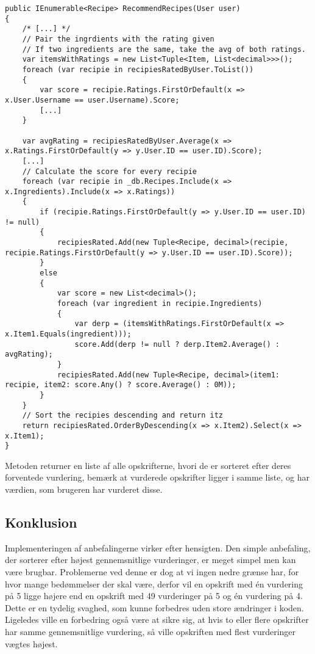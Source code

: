 \begin{lstlisting}[caption=Metoden \class{RecommendRecipes}. Sorterer opskrifter efter forventede vurdering for en given bruger., label=recommendrecipes]
public IEnumerable<Recipe> RecommendRecipes(User user)
{
    /* [...] */
    // Pair the ingrdients with the rating given
    // If two ingredients are the same, take the avg of both ratings.
    var itemsWithRatings = new List<Tuple<Item, List<decimal>>>();
    foreach (var recipie in recipiesRatedByUser.ToList())
    {
        var score = recipie.Ratings.FirstOrDefault(x => x.User.Username == user.Username).Score;
        [...]
    }

    var avgRating = recipiesRatedByUser.Average(x => x.Ratings.FirstOrDefault(y => y.User.ID == user.ID).Score);
    [...]
    // Calculate the score for every recipie
    foreach (var recipie in _db.Recipes.Include(x => x.Ingredients).Include(x => x.Ratings))
    {
        if (recipie.Ratings.FirstOrDefault(y => y.User.ID == user.ID) != null)
        {
            recipiesRated.Add(new Tuple<Recipe, decimal>(recipie, recipie.Ratings.FirstOrDefault(y => y.User.ID == user.ID).Score));
        }
        else
        {
            var score = new List<decimal>();
            foreach (var ingredient in recipie.Ingredients)
            {
                var derp = (itemsWithRatings.FirstOrDefault(x => x.Item1.Equals(ingredient)));
                score.Add(derp != null ? derp.Item2.Average() : avgRating);
            }
            recipiesRated.Add(new Tuple<Recipe, decimal>(item1: recipie, item2: score.Any() ? score.Average() : 0M));
        }
    }
    // Sort the recipies descending and return itz
    return recipiesRated.OrderByDescending(x => x.Item2).Select(x => x.Item1);
}
\end{lstlisting}

Metoden returner en liste af alle opskrifterne, hvori de er sorteret efter deres forventede vurdering, bemærk at vurderede opskrifter ligger i samme liste, og har værdien, som brugeren har vurderet disse.

\subsection{Konklusion}
Implementeringen af anbefalingerne virker efter hensigten.
Den simple anbefaling, der sorterer efter højest gennemsnitlige vurderinger, er meget simpel men kan være brugbar.
Problemerne ved denne er dog at vi ingen nedre grænse har, for hvor mange bedømmelser der skal være, derfor vil en opskrift med én vurdering på 5 ligge højere end en opskrift med 49 vurderinger på 5 og én vurdering på 4.
Dette er en tydelig svaghed, som kunne forbedres uden store ændringer i koden.
Ligeledes ville en forbedring også være at sikre sig, at hvis to eller flere opskrifter har samme gennemsnitlige vurdering, så ville opskriften med flest vurderinger vægtes højest.

